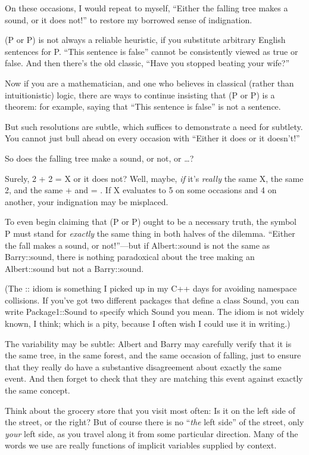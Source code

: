 {
 On these occasions, I would repeat to myself,
``Either the falling tree makes a sound, or it does
not!'' to restore my borrowed sense of indignation.}

{
 (P or {\textlnot}P) is not always a reliable heuristic, if you
substitute arbitrary English sentences for P. ``This
sentence is false'' cannot be consistently viewed as
true or false. And then there's the old classic,
``Have you stopped beating your
wife?''}

{
 Now if you are a mathematician, and one who believes in classical
(rather than intuitionistic) logic, there are ways to continue
insisting that (P or {\textlnot}P) is a theorem: for example, saying
that ``This sentence is false'' is
not a sentence.}

{
 But such resolutions are subtle, which suffices to demonstrate a
need for subtlety. You cannot just bull ahead on every occasion with
``Either it does or it
doesn't!''}

{
 So does the falling tree make a sound, or not, or \ldots ?}

{
 Surely, 2 + 2 = X or it does not? Well, maybe, \textit{if}
it's \textit{really} the same X, the same 2, and the
same + and = . If X evaluates to 5 on some occasions and 4 on another,
your indignation may be misplaced.}

{
 To even begin claiming that (P or {\textlnot}P) ought to be a
necessary truth, the symbol P must stand for \textit{exactly} the same
thing in both halves of the dilemma. ``Either the fall
makes a sound, or not!''---but if Albert::sound is
not the same as Barry::sound, there is nothing paradoxical about the
tree making an Albert::sound but not a Barry::sound.}

{
 (The :: idiom is something I picked up in my C++ days for avoiding
namespace collisions. If you've got two different
packages that define a class Sound, you can write Package1::Sound to
specify which Sound you mean. The idiom is not widely known, I think;
which is a pity, because I often wish I could use it in writing.)}

{
 The variability may be subtle: Albert and Barry may carefully
verify that it is the same tree, in the same forest, and the same
occasion of falling, just to ensure that they really do have a
substantive disagreement about exactly the same event. And then forget
to check that they are matching this event against exactly the same
concept.}

{
 Think about the grocery store that you visit most often: Is it on
the left side of the street, or the right? But of course there is no
``\textit{the} left side'' of the
street, only \textit{your} left side, as you travel along it from some
particular direction. Many of the words we use are really functions of
implicit variables supplied by context.}

